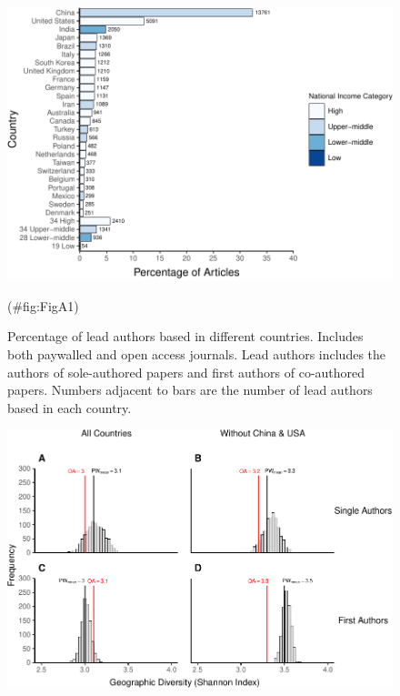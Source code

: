 \clearpage
\makeatletter
\efloat@restorefloats
\makeatother


\begin{appendix}
\section{}
\begin{figure}

{\centering \includegraphics{Smith_etal_APC_ms_files/figure-latex/FigA1-1} 

}

\caption{Percentage of lead authors based in different countries. Includes both paywalled and open access journals. Lead authors includes the authors of sole-authored papers and first authors of co-authored papers. Numbers adjacent to bars are the number of lead authors based in each country.}(\#fig:FigA1)
\end{figure}

\begin{figure}

{\centering \includegraphics{Smith_etal_APC_ms_files/figure-latex/FigA2-1} 

}
\end{figure}
\end{appendix}
